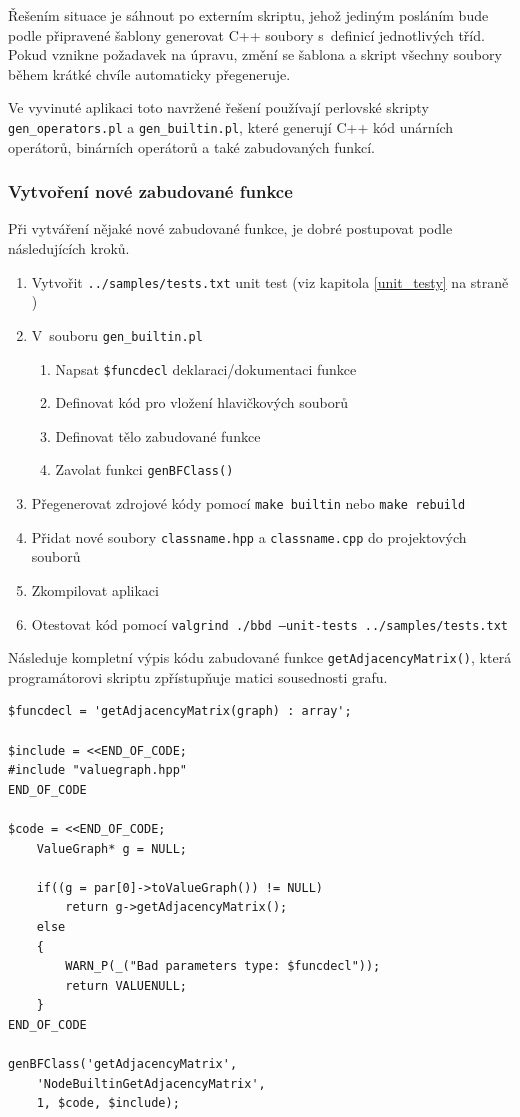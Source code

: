 \documentclass[11pt,twoside,a4paper]{book}
\begin{document}
Řešením situace je sáhnout po externím skriptu, jehož jediným posláním bude podle při\-pra\-ve\-né šablony generovat C++ soubory s~definicí jednotlivých tříd. Pokud vznikne požadavek na úpravu, změní se šablona a skript všechny soubory během krátké chvíle automaticky přegeneruje.

Ve vyvinuté aplikaci toto navržené řešení používají perlovské skripty \texttt{gen\_\-ope\-ra\-tors.pl} a \texttt{gen\_builtin.pl}, které generují C++ kód unárních operátorů, binárních operátorů a také zabudovaných funkcí.


\subsubsection{Vytvoření nové zabudované funkce}

Při vytváření nějaké nové zabudované funkce, je dobré postupovat podle následujících kroků.

\begin{enumerate}
\item Vytvořit \texttt{../samples/tests.txt} unit test (viz kapitola \ref{unit_testy} na straně \pageref{unit_testy})
\item V~souboru \texttt{gen\_builtin.pl}
\begin{enumerate}
\item Napsat \texttt{\$funcdecl} deklaraci/dokumentaci funkce
\item Definovat kód pro vložení hlavičkových souborů
\item Definovat tělo zabudované funkce
\item Zavolat funkci \texttt{genBFClass()}
\end{enumerate}
\item Přegenerovat zdrojové kódy pomocí \texttt{make builtin} nebo \texttt{make rebuild}
\item Přidat nové soubory \texttt{classname.hpp} a \texttt{classname.cpp} do projektových souborů
\item Zkompilovat aplikaci
\item Otestovat kód pomocí \texttt{valgrind ./bbd --unit-tests ../samples/tests.txt}
\end{enumerate}

Následuje kompletní výpis kódu zabudované funkce \texttt{getAdjacencyMatrix()}, která pro\-gra\-má\-to\-ro\-vi skriptu zpřístupňuje matici sousednosti grafu.

\begin{verbatim}
$funcdecl = 'getAdjacencyMatrix(graph) : array';

$include = <<END_OF_CODE;
#include "valuegraph.hpp"
END_OF_CODE

$code = <<END_OF_CODE;
    ValueGraph* g = NULL;

    if((g = par[0]->toValueGraph()) != NULL)
        return g->getAdjacencyMatrix();
    else
    {
        WARN_P(_("Bad parameters type: $funcdecl"));
        return VALUENULL;
    }
END_OF_CODE

genBFClass('getAdjacencyMatrix',
    'NodeBuiltinGetAdjacencyMatrix',
    1, $code, $include);
\end{verbatim}
\end{document}
